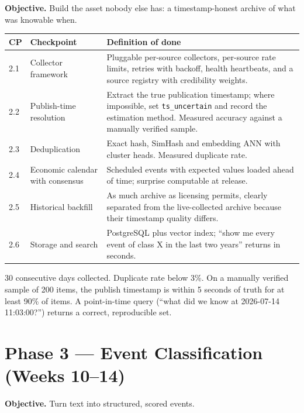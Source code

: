 \textbf{Objective.} Build the asset nobody else has: a timestamp-honest archive
of what was knowable when.

\begin{longtable}{@{}p{1.4cm}p{6.0cm}p{7.0cm}@{}}
\toprule
\textbf{CP} & \textbf{Checkpoint} & \textbf{Definition of done}\\
\midrule
2.1 & Collector framework & Pluggable per-source collectors, per-source rate
limits, retries with backoff, health heartbeats, and a source registry with
credibility weights.\\
2.2 & Publish-time resolution & Extract the true publication timestamp; where
impossible, set \texttt{ts\_uncertain} and record the estimation method.
Measured accuracy against a manually verified sample.\\
2.3 & Deduplication & Exact hash, SimHash and embedding ANN with cluster heads.
Measured duplicate rate.\\
2.4 & Economic calendar with consensus & Scheduled events with expected values
loaded ahead of time; surprise computable at release.\\
2.5 & Historical backfill & As much archive as licensing permits, clearly
separated from the live-collected archive because their timestamp quality
differs.\\
2.6 & Storage and search & PostgreSQL plus vector index; ``show me every event of
class X in the last two years'' returns in seconds.\\
\bottomrule
\end{longtable}

\begin{gatebox}[title={Gate G2}]
30 consecutive days collected. Duplicate rate below 3\%. On a manually verified
sample of 200 items, the publish timestamp is within 5 seconds of truth for at
least 90\% of items. A point-in-time query (``what did we know at
2026-07-14 11:03:00?'') returns a correct, reproducible set.
\end{gatebox}

\section{Phase 3 --- Event Classification (Weeks 10--14)}

\textbf{Objective.} Turn text into structured, scored events.

